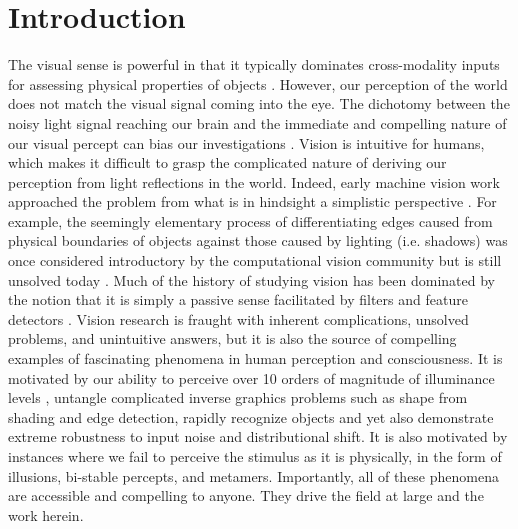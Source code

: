 \chapter{Introduction}
The visual sense is powerful in that it typically dominates cross-modality inputs for assessing physical properties of objects \parencite{ernst2002humans}. However, our perception of the world does not match the visual signal coming into the eye. The dichotomy between the noisy light signal reaching our brain and the immediate and compelling nature of our visual percept can bias our investigations \parencite{rodieck1998first}. Vision is intuitive for humans, which makes it difficult to grasp the complicated nature of deriving our perception from light reflections in the world. Indeed, early machine vision work approached the problem from what is in hindsight a simplistic perspective \parencite{papert1966summer}. For example, the seemingly elementary process of differentiating edges caused from physical boundaries of objects against those caused by lighting (i.e. shadows) was once considered introductory by the computational vision community but is still unsolved today \parencite{adelson2000lightness, barron2012shape}. Much of the history of studying vision has been dominated by the notion that it is simply a passive sense facilitated by filters and feature detectors \parencite{olshausen201320}. Vision research is fraught with inherent complications, unsolved problems, and unintuitive answers, but it is also the source of compelling examples of fascinating phenomena in human perception and consciousness. It is motivated by our ability to perceive over 10 orders of magnitude of illuminance levels \parencite{norton2002psychophysical}, untangle complicated inverse graphics problems such as shape from shading and edge detection, rapidly recognize objects and yet also demonstrate extreme robustness to input noise and distributional shift. It is also motivated by instances where we fail to perceive the stimulus as it is physically, in the form of illusions, bi-stable percepts, and metamers. Importantly, all of these phenomena are accessible and compelling to anyone. They drive the field at large and the work herein.

